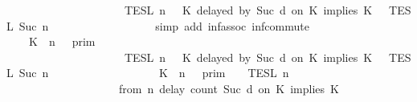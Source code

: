 \begin{isabellebody}
\ \ \ \ \ \ \ \ \ \ \ \ \ \ \ \ \ \ {\isasyminter}\ {\isasymlbrakk}{\isasymlbrakk}\ {\isasymPsi}\ {\isasymrbrakk}{\isasymrbrakk}\isactrlsub T\isactrlsub E\isactrlsub S\isactrlsub L\isactrlbsup {\isasymge}\ n\isactrlesup \ {\isasyminter}\ {\isasymlbrakk}{\isasymlbrakk}\ {\isacharparenleft}K\ delayed\ by\ {\isacharparenleft}Suc\ d{\isacharparenright}\ on\ K\ implies\ K\ {\isacharhash}\ {\isasymPhi}\ {\isasymrbrakk}{\isasymrbrakk}\isactrlsub T\isactrlsub E\isactrlsub S\isactrlsub L\isactrlbsup {\isasymge}\ Suc\ n\isactrlesup \isanewline
\ \ \ \ \ \ \ \ \ \ \ \ {\isacharparenright}{\isacartoucheclose}\isanewline
\ \ \ \ \isamarkupfalse%
\ {\isacharparenleft}simp\ add{\isacharcolon}\ inf{\isacharunderscore}assoc\ inf{\isacharunderscore}commute{\isacharparenright}\isanewline
\ \ \isamarkupfalse%
\ \isamarkupfalse%
\ {\isacartoucheopen}{\isachardot}{\isachardot}{\isachardot}\ {\isacharequal}\ {\isacharparenleft}{\isasymlbrakk}{\isasymlbrakk}\ {\isacharparenleft}K\ {\isasymnot}{\isasymUp}\ n{\isacharparenright}\ {\isacharhash}\ {\isasymGamma}\ {\isasymrbrakk}{\isasymrbrakk}\isactrlsub p\isactrlsub r\isactrlsub i\isactrlsub m\ \isanewline
\ \ \ \ \ \ \ \ \ \ \ \ \ \ \ \ \ \ {\isasyminter}\ {\isasymlbrakk}{\isasymlbrakk}\ {\isasymPsi}\ {\isasymrbrakk}{\isasymrbrakk}\isactrlsub T\isactrlsub E\isactrlsub S\isactrlsub L\isactrlbsup {\isasymge}\ n\isactrlesup \ {\isasyminter}\ {\isasymlbrakk}{\isasymlbrakk}\ {\isacharparenleft}K\ delayed\ by\ {\isacharparenleft}Suc\ d{\isacharparenright}\ on\ K\ implies\ K\ {\isacharhash}\ {\isasymPhi}\ {\isasymrbrakk}{\isasymrbrakk}\isactrlsub T\isactrlsub E\isactrlsub S\isactrlsub L\isactrlbsup {\isasymge}\ Suc\ n\isactrlesup {\isacharparenright}\isanewline
\ \ \ \ \ \ \ \ \ \ \ \ \ \ \ \ \ {\isasymunion}\ {\isacharparenleft}{\isasymlbrakk}{\isasymlbrakk}\ {\isacharparenleft}K\ {\isasymUp}\ n{\isacharparenright}\ {\isacharhash}\ {\isasymGamma}\ {\isasymrbrakk}{\isasymrbrakk}\isactrlsub p\isactrlsub r\isactrlsub i\isactrlsub m\ {\isasyminter}\ {\isasymlbrakk}{\isasymlbrakk}\ {\isasymPsi}\ {\isasymrbrakk}{\isasymrbrakk}\isactrlsub T\isactrlsub E\isactrlsub S\isactrlsub L\isactrlbsup {\isasymge}\ n\isactrlesup \isanewline
\ \ \ \ \ \ \ \ \ \ \ \ \ \ \ \ \ \ {\isasyminter}\ {\isasymlbrakk}{\isasymlbrakk}\ {\isacharparenleft}from\ n\ delay\ count\ {\isacharparenleft}Suc\ d{\isacharparenright}\ on\ K\ implies\ K\isanewline

\end{isabellebody}
